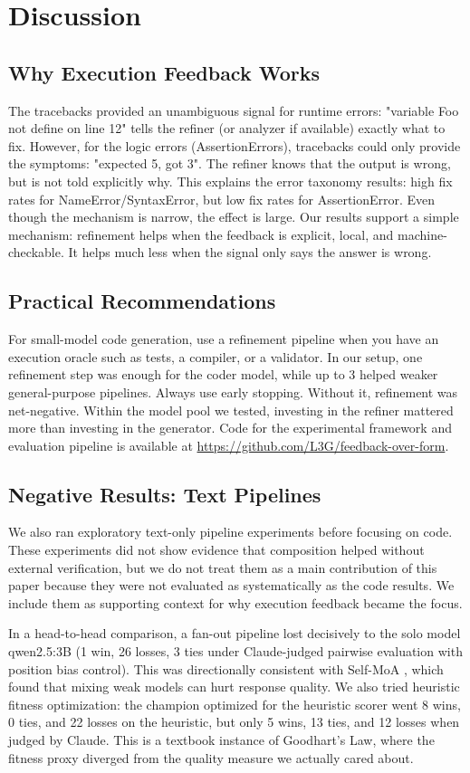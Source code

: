 \documentclass{article}
\begin{document}
\section{Discussion}
\subsection{Why Execution Feedback Works}
The tracebacks provided an unambiguous signal for runtime errors: "variable Foo not define on line 12" tells the refiner (or analyzer if available) exactly what to fix. However, for the logic errors (AssertionErrors), tracebacks could only provide the symptoms: "expected 5, got 3". The refiner knows that the output is wrong, but is not told explicitly why. This explains the error taxonomy results: high fix rates for NameError/SyntaxError, but low fix rates for AssertionError. Even though the mechanism is narrow, the effect is large. Our results support a simple mechanism: refinement helps when the feedback is explicit, local, and machine-checkable. It helps much less when the signal only says the answer is wrong.

\subsection{Practical Recommendations}
For small-model code generation, use a refinement pipeline when you have an execution oracle such as tests, a compiler, or a validator. In our setup, one refinement step was enough for the coder model, while up to 3 helped weaker general-purpose pipelines. Always use early stopping. Without it, refinement was net-negative. Within the model pool we tested, investing in the refiner mattered more than investing in the generator. Code for the experimental framework and evaluation pipeline is available at \url{https://github.com/L3G/feedback-over-form}.

\subsection{Negative Results: Text Pipelines}
We also ran exploratory text-only pipeline experiments before focusing on code. These experiments did not show evidence that composition helped without external verification, but we do not treat them as a main contribution of this paper because they were not evaluated as systematically as the code results. We include them as supporting context for why execution feedback became the focus.

In a head-to-head comparison, a fan-out pipeline lost decisively to the solo model qwen2.5:3B (1 win, 26 losses, 3 ties under Claude-judged pairwise evaluation with position bias control). This was directionally consistent with Self-MoA \cite{selfmoa2025}, which found that mixing weak models can hurt response quality. We also tried heuristic fitness optimization: the champion optimized for the heuristic scorer went 8 wins, 0 ties, and 22 losses on the heuristic, but only 5 wins, 13 ties, and 12 losses when judged by Claude. This is a textbook instance of Goodhart's Law, where the fitness proxy diverged from the quality measure we actually cared about.
\end{document}
